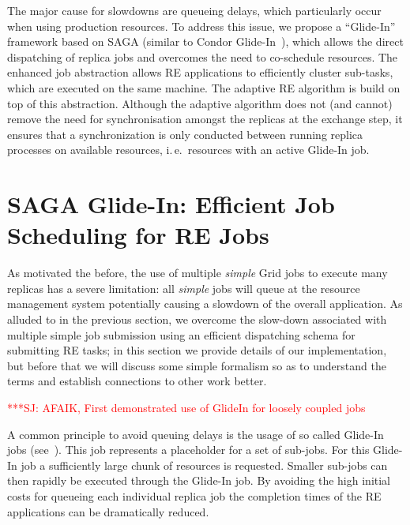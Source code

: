 \documentclass{rspublic}
\newcommand{\jhanote}[1]{ {\textcolor{red} { ***SJ: #1 }}}
\newcommand{\jhanote}[1]{}
\begin{document}
The major cause for slowdowns are queueing delays, which particularly
occur when using production resources. To address this issue, we
propose a ``Glide-In'' framework based on SAGA (similar to Condor
Glide-In~\citep{citeulike:291860}), which allows the direct
dispatching of replica jobs and overcomes the need to co-schedule
resources.  The enhanced job abstraction allows RE applications to
efficiently cluster sub-tasks, which are executed on the same machine.
The adaptive RE algorithm is build on top of this abstraction.
Although the adaptive algorithm does not (and cannot) remove the need
for synchronisation amongst the replicas at the exchange step, it
ensures that a synchronization is only conducted between running
replica processes on available resources, i.\,e.\ resources with an
active Glide-In job.


\section{SAGA Glide-In: Efficient Job Scheduling for RE Jobs}
\label{sec:glidein}

As motivated the before, the use of multiple {\it simple} Grid jobs to
execute many replicas has a severe limitation: all {\it simple} jobs
will queue at the resource management system potentially causing a
slowdown of the overall application.  As alluded to in the previous
section, we overcome the slow-down associated with multiple simple job
submission using an efficient dispatching schema for submitting RE
tasks; in this section we provide details of our implementation, but
before that we will discuss some simple formalism so as to understand
the terms and establish connections to other work better.

\jhanote{AFAIK, First demonstrated use of GlideIn for loosely coupled
  jobs}


A common principle to avoid queuing delays is the usage of so called
Glide-In jobs (see~\cite{citeulike:291860}). This job represents a
placeholder for a set of sub-jobs. For this Glide-In job a
sufficiently large chunk of resources is requested. Smaller sub-jobs
can then rapidly be executed through the Glide-In job. By avoiding the
high initial costs for queueing each individual replica job the
completion times of the RE applications can be dramatically reduced.
\end{document}
